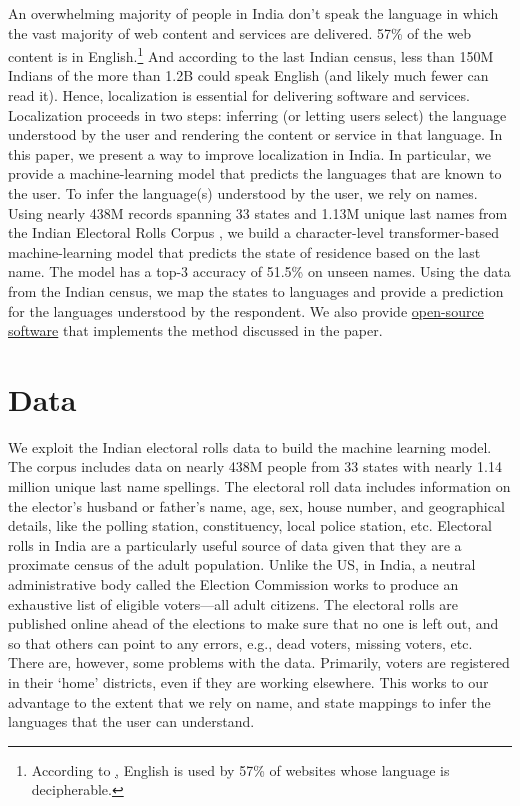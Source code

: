 \documentclass[11pt,  letterpaper]{article}
\begin{document}
An overwhelming majority of people in India don’t speak the language in which the vast majority of web content and services are delivered. 57\% of the web content is in English.\footnote{According to \href{https://w3techs.com/technologies/overview/content_language}, English is used by 57\% of websites whose language is decipherable.} And according to the last Indian census, less than 150M Indians of the more than 1.2B could speak English (and likely much fewer can read it). Hence, localization is essential for delivering software and services. Localization proceeds in two steps: inferring (or letting users select) the language understood by the user and rendering the content or service in that language. In this paper, we present a way to improve localization in India. In particular, we provide a machine-learning model that predicts the languages that are known to the user. To infer the language(s) understood by the user, we rely on names. Using nearly 438M records spanning 33 states and 1.13M unique last names from the Indian Electoral Rolls Corpus \citep{DVN/OG47IV_2023}, we build a character-level transformer-based machine-learning model that predicts the state of residence based on the last name. The model has a top-3 accuracy of 51.5\%  on unseen names. Using the data from the Indian census, we map the states to languages and provide a prediction for the languages understood by the respondent. We also provide \href{https://github.com/in-rolls/instate}{open-source software} that implements the method discussed in the paper. 


\section{Data}

We exploit the Indian electoral rolls data \citep{DVN/OG47IV_2023, DVN/MUEGDT_2018} to build the machine learning model. The corpus includes data on nearly 438M people from 33 states with nearly 1.14 million unique last name spellings. The electoral roll data includes information on the elector's husband or father’s name, age, sex, house number, and geographical details, like the polling station, constituency, local police station, etc. Electoral rolls in India are a particularly useful source of data given that they are a proximate census of the adult population. Unlike the US, in India, a neutral administrative body called the Election Commission works to produce an exhaustive list of eligible voters—all adult citizens. The electoral rolls are published online ahead of the elections to make sure that no one is left out, and so that others can point to any errors, e.g., dead voters, missing voters, etc. There are, however, some problems with the data. Primarily, voters are registered in their `home’ districts, even if they are working elsewhere. This works to our advantage to the extent that we rely on name, and state mappings to infer the languages that the user can understand.
\end{document}
